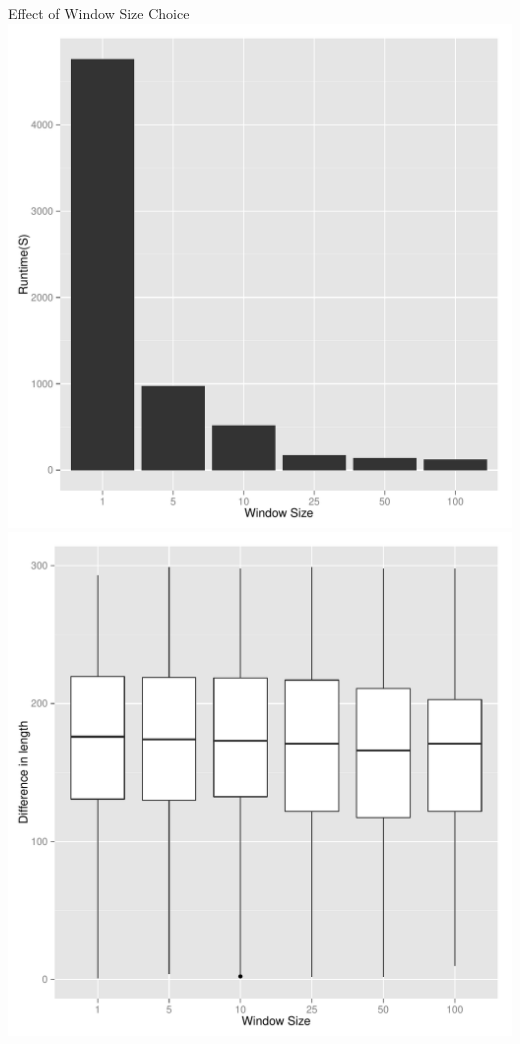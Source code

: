 \documentclass{beamer}
\begin{document}
\begin{frame}{Effect of Window Size Choice}
\center
\includegraphics[height=.6\textheight]{runtime_by_windowSize.pdf}\hspace{1mm}\includegraphics[height=.6\textheight]{breakpoint_resolution_by_windowSize.pdf} \\

\end{frame}
\end{document}
